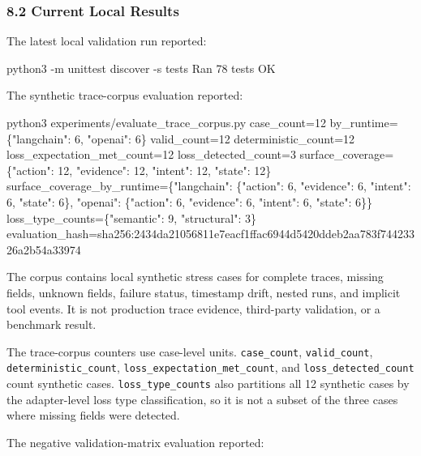 \documentclass[
]{article}
\newenvironment{Shaded}{}{}
\newcommand{\NormalTok}[1]{#1}
\begin{document}
\subsubsection{8.2 Current Local Results}\label{current-local-results}

The latest local validation run reported:

\begin{Shaded}
\begin{Highlighting}[]
\NormalTok{python3 {-}m unittest discover {-}s tests}
\NormalTok{Ran 78 tests}
\NormalTok{OK}
\end{Highlighting}
\end{Shaded}

The synthetic trace-corpus evaluation reported:

\begin{Shaded}
\begin{Highlighting}[]
\NormalTok{python3 experiments/evaluate\_trace\_corpus.py}
\NormalTok{case\_count=12}
\NormalTok{by\_runtime=\{"langchain": 6, "openai": 6\}}
\NormalTok{valid\_count=12}
\NormalTok{deterministic\_count=12}
\NormalTok{loss\_expectation\_met\_count=12}
\NormalTok{loss\_detected\_count=3}
\NormalTok{surface\_coverage=\{"action": 12, "evidence": 12, "intent": 12, "state": 12\}}
\NormalTok{surface\_coverage\_by\_runtime=\{"langchain": \{"action": 6, "evidence": 6, "intent": 6, "state": 6\}, "openai": \{"action": 6, "evidence": 6, "intent": 6, "state": 6\}\}}
\NormalTok{loss\_type\_counts=\{"semantic": 9, "structural": 3\}}
\NormalTok{evaluation\_hash=sha256:2434da21056811e7eacf1ffac6944d5420ddeb2aa783f74423326a2b54a33974}
\end{Highlighting}
\end{Shaded}

The corpus contains local synthetic stress cases for complete traces,
missing fields, unknown fields, failure status, timestamp drift, nested
runs, and implicit tool events. It is not production trace evidence,
third-party validation, or a benchmark result.

The trace-corpus counters use case-level units. \texttt{case\_count},
\texttt{valid\_count}, \texttt{deterministic\_count},
\texttt{loss\_expectation\_met\_count}, and
\texttt{loss\_detected\_count} count synthetic cases.
\texttt{loss\_type\_counts} also partitions all 12 synthetic cases by
the adapter-level loss type classification, so it is not a subset of the
three cases where missing fields were detected.

The negative validation-matrix evaluation reported:
\end{document}
